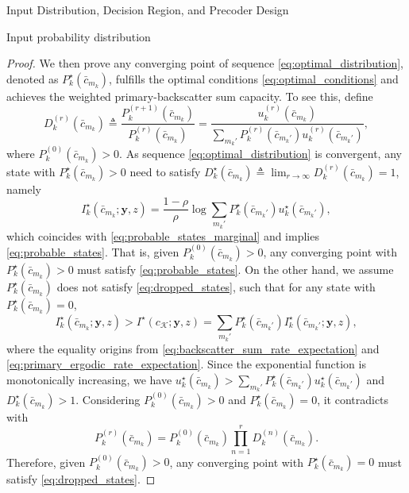\documentclass[journal]{IEEEtran}
\begin{document}
\begin{section}{Input Distribution, Decision Region, and Precoder Design}
\begin{subsection}{Input probability distribution}
\begin{proof}
				We then prove any converging point of sequence \eqref{eq:optimal_distribution}, denoted as $P_k^{\star}(\bar{c}_{m_k})$, fulfills the optimal conditions \eqref{eq:optimal_conditions} and achieves the weighted primary-backscatter sum capacity. To see this, define
				\begin{equation}
					D_k^{(r)}(\bar{c}_{m_k}) \triangleq \frac{P_k^{(r+1)}(\bar{c}_{m_k})}{P_k^{(r)}(\bar{c}_{m_k})} = \frac{u_k^{(r)}(\bar{c}_{m_k})}{\sum_{m_k'} P_k^{(r)}(\bar{c}_{m_k'}) u_k^{(r)}(\bar{c}_{m_k'})},
				\end{equation}
				where $P_k^{(0)}(\bar{c}_{m_k}) > 0$. As sequence \eqref{eq:optimal_distribution} is convergent, any state with $P_k^{\star}(\bar{c}_{m_k}) > 0$ need to satisfy $D_k^{\star}(\bar{c}_{m_k}) \triangleq \lim_{r \to \infty} D_k^{(r)}(\bar{c}_{m_k}) = 1$, namely
				\begin{equation}
					I_k^{\star}(\bar{c}_{m_k};\boldsymbol{y},z) = \frac{1 - \rho}{\rho} \log \sum_{m_k'} P_k^{\star}(\bar{c}_{m_k'}) u_k^{\star}(\bar{c}_{m_k'}),
				\end{equation}
				which coincides with \eqref{eq:probable_states_marginal} and implies \eqref{eq:probable_states}. That is, given $P_k^{(0)}(\bar{c}_{m_k}) > 0$, any converging point with $P_k^{\star}(\bar{c}_{m_k}) > 0$ must satisfy \eqref{eq:probable_states}.
				On the other hand, we assume $P_k^{\star}(\bar{c}_{m_k})$ does not satisfy \eqref{eq:dropped_states}, such that for any state with $P_k^{\star}(\bar{c}_{m_k}) = 0$,
				\begin{equation}
					I_k^{\star}(\bar{c}_{m_k};\boldsymbol{y},z) > I^{\star}(c_{\mathcal{K}};\boldsymbol{y},z) = \sum_{m_k'} P_k^{\star}(\bar{c}_{m_k'}) I_k^{\star}(\bar{c}_{m_k'};\boldsymbol{y},z),
				\end{equation}
				where the equality origins from \eqref{eq:backscatter_sum_rate_expectation} and \eqref{eq:primary_ergodic_rate_expectation}. Since the exponential function is monotonically increasing, we have $u_k^{\star}(\bar{c}_{m_k}) > \sum_{m_k'} P_k^{\star}(\bar{c}_{m_k'}) u_k^{\star}(\bar{c}_{m_k'})$ and $D_k^{\star}(\bar{c}_{m_k}) > 1$. Considering $P_k^{(0)}(\bar{c}_{m_k}) > 0$ and $P_k^{\star}(\bar{c}_{m_k}) = 0$, it contradicts with
				\begin{equation}
					P_k^{(r)}(\bar{c}_{m_k}) = P_k^{(0)}(\bar{c}_{m_k}) \prod_{n=1}^r D_k^{(n)}(\bar{c}_{m_k}).
				\end{equation}
				Therefore, given $P_k^{(0)}(\bar{c}_{m_k}) > 0$, any converging point with $P_k^{\star}(\bar{c}_{m_k}) = 0$ must satisfy \eqref{eq:dropped_states}.


\end{proof}
\end{subsection}
\end{section}
\end{document}
